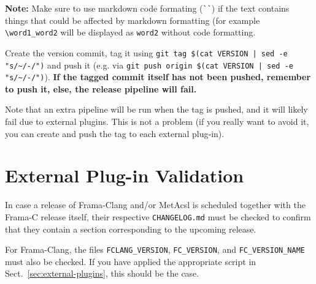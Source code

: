\textbf{Note:} Make sure to use markdown code formating (\verb+``+) if the text
contains things that could be affected by markdown formatting (for example
\verb+\word1_word2+ will be displayed as \verb+word2+ without code formatting.

Create the version commit, tag it using \texttt{git tag \$(cat VERSION | sed -e "s/\textasciitilde /-/")}
and push it (e.g. via \texttt{git push origin \$(cat VERSION | sed -e "s/\textasciitilde/-/")}).
\textbf{
  If the tagged commit itself has not been pushed, remember to push it, else,
  the release pipeline will fail.
}

Note that an extra pipeline will be run when the tag is pushed, and it will
likely fail due to external plugins. This is not a problem (if you really want
to avoid it, you can create and push the tag to each external plug-in).

\section{External Plug-in Validation}

In case a release of Frama-Clang and/or MetAcsl is scheduled together with the
Frama-C release itself, their respective \texttt{CHANGELOG.md} must be checked to confirm
that they contain a section corresponding to the upcoming release.

For Frama-Clang, the files \texttt{FCLANG\_VERSION}, \texttt{FC\_VERSION}, and
\texttt{FC\_VERSION\_NAME} must also be checked. If you have applied the
appropriate script in Sect.~\ref{sec:external-plugins}, this should be the case.

